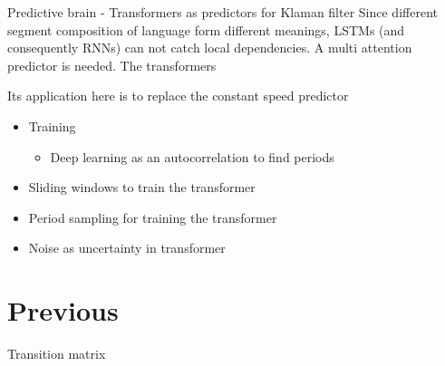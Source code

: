 \begin{frame}{Predictive brain - Transformers as predictors for Klaman filter}
    Since different segment composition of language form different meanings, LSTMs (and consequently RNNs) can not catch local dependencies. A multi attention predictor is needed. The transformers \cite{vaswani-2017-attention-is-all-you-need}
    
    Its application here is to replace the constant speed predictor
    
    
    \begin{itemize}
        \item Training
        \begin{itemize}
            \item Deep learning as an autocorrelation to find periods
        \end{itemize}
        \item Sliding windows to train the transformer
        \item Period sampling for training the transformer
        \item Noise as uncertainty in transformer
    
    \end{itemize}
    
    \section{Previous}
    Transition matrix
\end{frame}
